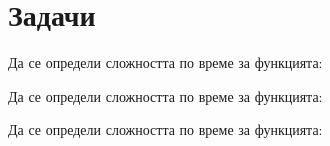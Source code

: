 \newpage

\section{Задачи}

\begin{problem}
Да се определи сложността по време за функцията:

\end{problem}

\begin{problem}
Да се определи сложността по време за функцията:

\end{problem}

\begin{problem}
Да се определи сложността по време за функцията:

\end{problem}